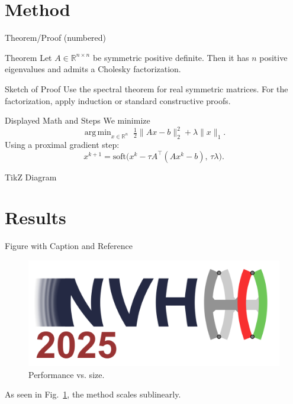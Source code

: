 \documentclass[aspectratio=169,10pt]{beamer} \mode<presentation>
\newcommand{\R}{\mathbb{R}}
\DeclareMathOperator*{\argmin}{arg\,min}
\begin{document}
\section{Method}

\begin{frame}[t]{Theorem/Proof (numbered)}
\begin{block}{Theorem}
Let $A\in\R^{n\times n}$ be symmetric positive definite. Then it has $n$ positive eigenvalues and admits a Cholesky factorization.
\end{block}

\begin{exampleblock}{Sketch of Proof}
Use the spectral theorem for real symmetric matrices. For the factorization, apply induction or standard constructive proofs.
\end{exampleblock}
\end{frame}

\begin{frame}{Displayed Math and Steps}
We minimize
\[
  \argmin_{x\in\R^n} \; \tfrac12\|Ax-b\|_2^2 + \lambda\|x\|_1.
\]
\pause
Using a proximal gradient step:
\[
  x^{k+1} = \mathrm{soft}\bigl(x^k - \tau A^\top(Ax^k-b),\, \tau\lambda\bigr).
\]
\end{frame}

\begin{frame}{TikZ Diagram}
\centering
{}
\end{frame}

\section{Results}

\begin{frame}{Figure with Caption and Reference}
\begin{figure}
  \centering
  \includegraphics[width=0.7\linewidth]{logo.png}
  \caption{Performance vs. size.}
  \label{fig:perf}
\end{figure}
As seen in Fig.~\ref{fig:perf}, the method scales sublinearly.
\end{frame}
\end{document}
